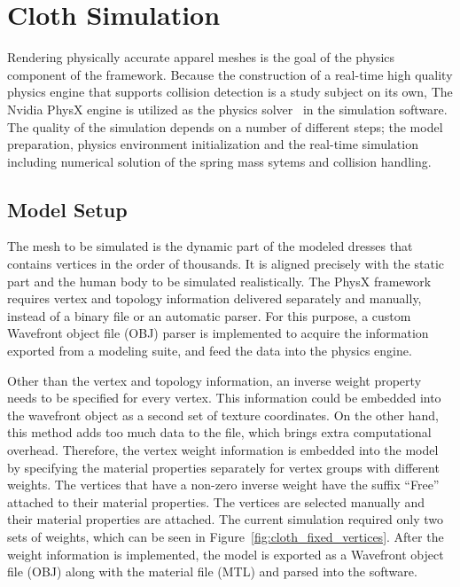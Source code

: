 \chapter{Cloth Simulation}
\label{chapter_cloth_simulation}

Rendering physically accurate apparel meshes is the goal of the physics component of the framework. Because the construction of a real-time high quality physics engine that supports collision detection is a study subject on its own, The Nvidia PhysX engine is utilized as the physics solver~\cite{Kim2011} in the simulation software. The quality of the simulation depends on a number of different steps; the model preparation, physics environment initialization and the real-time simulation including numerical solution of the spring mass sytems and collision handling. 

\section{Model Setup}
The mesh to be simulated is the dynamic part of the modeled dresses that contains vertices in the order of thousands. It is aligned precisely with the static part and the human body to be simulated realistically. The PhysX framework requires vertex and topology information delivered separately and manually, instead of a binary file or an automatic parser. For this purpose, a custom Wavefront object file (OBJ) parser is implemented to acquire the information exported from a modeling suite, and feed the data into the physics engine. 

Other than the vertex and topology information, an inverse weight property needs to be specified for every vertex.  This information could be embedded into the wavefront object as a second set of texture coordinates. On the other hand, this method adds too much data to the file, which brings extra computational overhead. Therefore, the vertex weight information is embedded into the model by specifying the material properties separately for vertex groups with different weights. The vertices that have a non-zero inverse weight have the suffix ``Free'' attached to their material properties. The vertices are selected manually and their material properties are attached.  The current simulation required only two sets of weights, which can be seen in Figure~\ref{fig:cloth_fixed_vertices}. After the weight information is implemented, the model is exported as a Wavefront object file (OBJ) along with the material file (MTL) and parsed into the software.

